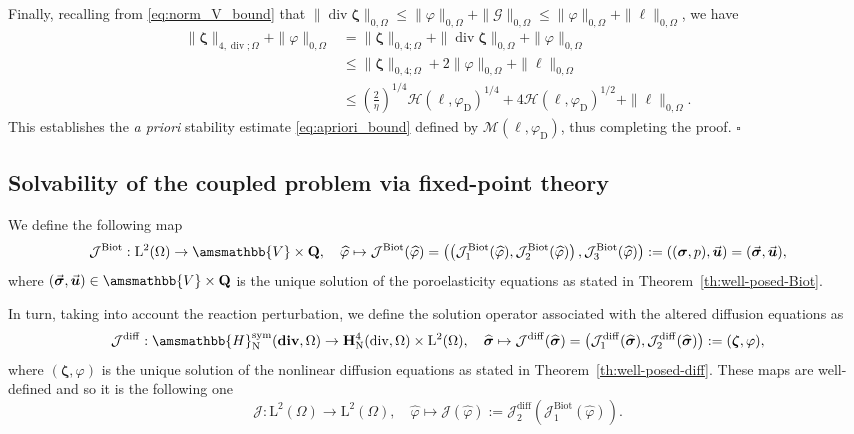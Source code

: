 \documentclass[fleqn,a4paper]{cas-sc}
\newcommand\vdiv{\mathop{\mathrm{div}}\nolimits}
\newcommand\bdiv{\mathop{\mathbf{div}}\nolimits}
\newcommand{\bu}{\boldsymbol{u}}
\newcommand{\bzeta}{\boldsymbol{\zeta}}
\newcommand{\0}{\boldsymbol{0}}
\newcommand\cG{\mathcal{G}}
\newcommand\cJ{\mathcal{J}}
\newcommand\bQ{\mathbf{Q}}
\newcommand\bbV{\amsmathbb{V}}
\newcommand\bbH{\amsmathbb{H}}
\newcommand\bH{\mathbf{H}}
\newcommand\rL{\mathrm{L}}
\newcommand\bsigma{\boldsymbol{\sigma}}
\numberwithin{equation}{section}
\numberwithin{figure}{section}
\newenvironment{proof}{\noindent{\it Proof.}}{\hfill$\square$}
\begin{document}
\begin{proof}
\begin{equation*}
    \end{equation*}
    Finally, recalling from \eqref{eq:norm_V_bound} that $\|\vdiv \bzeta\|_{0,\Omega} \le \|\varphi\|_{0, \Omega} + \|\cG\|_{0, \Omega} \le \|\varphi\|_{0, \Omega} + \|\ell\|_{0,\Omega}$, we have
    \begin{align*}
        \|\bzeta\|_{{4,\vdiv;\Omega}} + \|\varphi\|_{0, \Omega} &= \|\bzeta\|_{0,4;\Omega} + \|\vdiv \bzeta\|_{0,\Omega} + \|\varphi\|_{0, \Omega} \\[1ex]
        &\le \|\bzeta\|_{0,4;\Omega} + 2\|\varphi\|_{0, \Omega} + \|\ell\|_{0,\Omega} \\[1ex]
        &\le \left( \frac{2}{\eta} \right)^{1/4}  \mathcal{H}(\ell, \varphi_{\mathrm{D}})^{1/4} + 4  \mathcal{H}(\ell, \varphi_{\mathrm{D}})^{1/2} + \|\ell\|_{0,\Omega}.
    \end{align*}
    This establishes the \emph{a priori} stability estimate \eqref{eq:apriori_bound} defined by $\mathcal{M}(\ell, \varphi_{\mathrm{D}})$, thus completing the proof.
\end{proof}

\subsection{Solvability of the coupled problem via fixed-point theory}\label{sec:wp}
We define the following map
\[ 
\cJ^{\mathrm{Biot}}:\rL^2(\Omega)\to \bbV \times \bQ, \quad \widehat{\varphi} \mapsto \cJ^{\mathrm{Biot}}(\widehat{\varphi})= \left(\left(\cJ^{\mathrm{Biot}}_1(\widehat{\varphi}), \cJ^{\mathrm{Biot}}_2(\widehat{\varphi})\right),\cJ^{\mathrm{Biot}}_3(\widehat{\varphi})\right) := ( (\bsigma, p),  \vec{\bu}) = ( \vec{\bsigma}, \vec{\bu}), 
\]
where $( \vec{\bsigma}, \vec{\bu}) \in \bbV \times \bQ$ is the unique solution of the poroelasticity equations as stated in Theorem~\ref{th:well-posed-Biot}.

In turn, taking into account the reaction perturbation, we define the solution operator associated with the altered diffusion equations as 
\[ 
\cJ^{\mathrm{diff}}: \bbH^{\mathrm{sym}}_{\mathrm{N}}(\bdiv,\Omega) \to  \bH^4_\mathrm{N}(\vdiv,\Omega)\times \rL^2(\Omega), \quad \widehat{\bsigma} \mapsto \cJ^{\mathrm{diff}}(\widehat{\bsigma}) = \left(\cJ^{\mathrm{diff}}_1(\widehat{\bsigma}),\cJ^{\mathrm{diff}}_2(\widehat{\bsigma})\right) := ( \bzeta, \varphi),
\]
where $(\bzeta, \varphi)$ is the unique solution of the nonlinear diffusion equations as stated in Theorem~\ref{th:well-posed-diff}. 
These maps are well-defined and so it is the following one
\begin{equation}\label{Operator-J}
\mathcal{J}: \rL^{2}(\Omega)  \to  \rL^{2}(\Omega), \quad \widehat{\varphi} \mapsto \cJ(\widehat{\varphi}):= \cJ^{\mathrm{diff}}_2\left(\cJ^{\mathrm{Biot}}_1(\widehat{\varphi})\right).
\end{equation}
\end{document}
